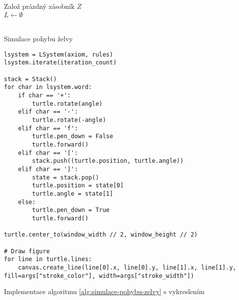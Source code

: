 \begin{algorithm}[h]
    Založ prázdný zásobník $Z$\\
    $L\gets\emptyset$\\
    \\
    \caption{Simulace pohybu želvy}
    \label{alg:simulace-pohybu-zelvy}
\end{algorithm}
\begin{program}[h]
\begin{lstlisting}[style=python]
lsystem = LSystem(axiom, rules)
lsystem.iterate(iteration_count)

stack = Stack()
for char in lsystem.word:
    if char == '+':
        turtle.rotate(angle)
    elif char == '-':
        turtle.rotate(-angle)
    elif char == 'f':
        turtle.pen_down = False
        turtle.forward()
    elif char == '[':
        stack.push((turtle.position, turtle.angle))
    elif char == ']':
        state = stack.pop()
        turtle.position = state[0]
        turtle.angle = state[1]
    else:
        turtle.pen_down = True
        turtle.forward()

turtle.center_to(window_width // 2, window_height // 2)

# Draw figure
for line in turtle.lines:
    canvas.create_line(line[0].x, line[0].y, line[1].x, line[1].y, fill=args["stroke_color"], width=args["stroke_width"])
\end{lstlisting}
    \caption{Implementace algoritmu \ref{alg:simulace-pohybu-zelvy} s vykreslením}
    \label{prog:simulace-pohybu-zelvy-a-vykresleni}
\end{program}